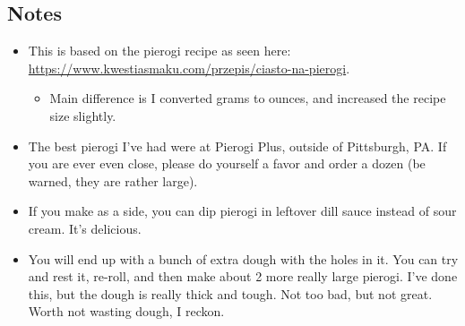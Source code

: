 \begin{multicols}{2}
\subsection*{Notes}
\begin{itemize}
    \item This is based on the pierogi recipe as seen here: \url{https://www.kwestiasmaku.com/przepis/ciasto-na-pierogi}.
    \begin{itemize}
        \item Main difference is I converted grams to ounces, and increased the recipe size slightly.
    \end{itemize}
    \item The best pierogi I've had were at Pierogi Plus, outside of Pittsburgh, PA. If you are ever even close, please do yourself a favor and order a dozen (be warned, they are rather large).
    \item If you make  as a side, you can dip pierogi in leftover dill sauce instead of sour cream. It's delicious.
    \item You will end up with a bunch of extra dough with the holes in it. You can try and rest it, re-roll, and then make about 2 more really large pierogi. I've done this, but the dough is really thick and tough. Not too bad, but not great. Worth not wasting dough, I reckon.
\end{itemize}
\end{multicols}
\clearpage